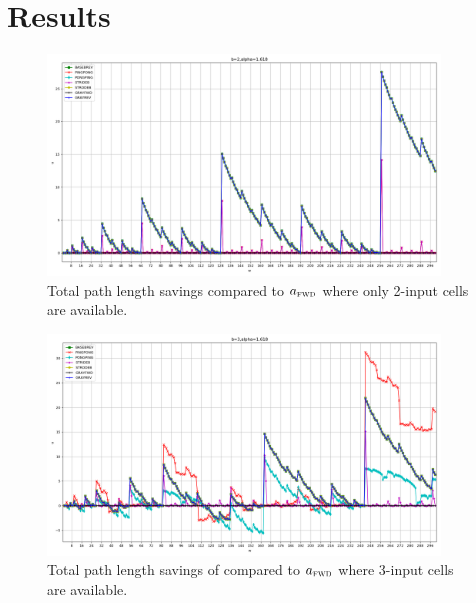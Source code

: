\documentclass[11pt,twoside]{article}
\begin{document}
\section{Results}
\begin{figure}[h]
    \centering
    \includegraphics[width=0.93\textwidth]{b=2,alpha=1_618.png}
    \caption{Total path length savings compared to $a_{\textsc{fwd}}$
             where only 2-input cells are available.
             \label{fig:b=2,alpha=1_618}}
\end{figure}
\vfill
\begin{figure}[h]
    \centering
    \includegraphics[width=0.93\textwidth]{b=3,alpha=1_618.png}
    \caption{Total path length savings of compared to $a_{\textsc{fwd}}$ where
             3-input cells are available.
             \label{fig:b=3,alpha=1_618}}
\end{figure}
\end{document}
